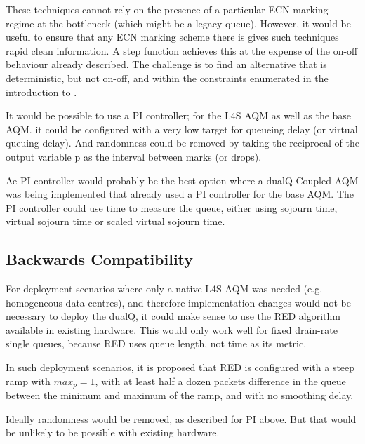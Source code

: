 These techniques cannot rely on the presence of a particular ECN marking regime at the bottleneck (which might be a legacy queue). However, it would be useful to ensure that any ECN marking scheme there is gives such techniques rapid clean information. A step function achieves this at the expense of the on-off behaviour already described. The challenge is to find an alternative that is deterministic, but not on-off, and within the constraints enumerated in the introduction to \cite{Briscoe17c:l4saqm_TR}. 

It would be possible to use a PI controller; for the L4S AQM as well as the base AQM. it could be configured with a very low target for queueing delay (or virtual queuing delay). And randomness could be removed by taking the reciprocal of the output variable p as the interval between marks (or drops). 

Ae PI controller would probably be the best option where a dualQ Coupled AQM was being implemented that already used a PI controller for the base AQM. The PI controller could use time to measure the queue, either using sojourn time, virtual sojourn time or scaled virtual sojourn time.

\subsection{Backwards Compatibility}\label{l4saqmtr_gradient-compat}

For deployment scenarios where only a native L4S AQM was needed (e.g. homogeneous data centres), and therefore implementation changes would not be necessary to deploy the dualQ, it could make sense to use the RED algorithm available in existing hardware. This would only work well for fixed drain-rate single queues, because RED uses queue length, not time as its metric. 

In such deployment scenarios, it is proposed that RED is configured with a steep ramp with \(max_p=1\), with at least half a dozen packets difference in the queue between the minimum and maximum of the ramp, and with no smoothing delay.

Ideally randomness would be removed, as described for PI above. But that would be unlikely to be possible with existing hardware.

